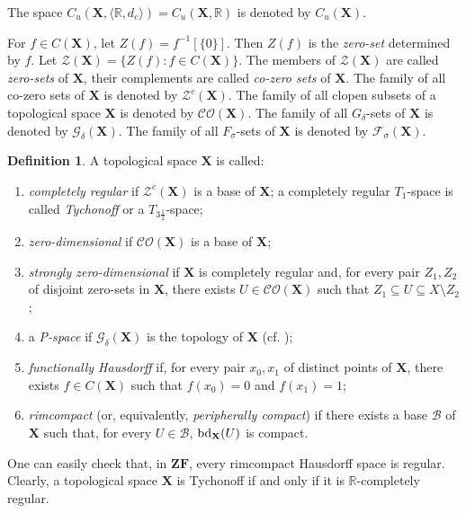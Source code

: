\documentclass[12pt,twoside,leqno]{article}
\theoremstyle{plain}
\theoremstyle{definition}
\newtheorem{definition}[theorem]{Definition}
\theoremstyle{remark}
\DeclareMathOperator{\bd}{{\rm bd}}
\begin{document}
The space $C_{u}(\mathbf{X}, \langle \mathbb{R}, d_e\rangle)=C_{u}(\mathbf{X}, \mathbb{R})$ is denoted by $C_{u}(\mathbf{X})$. 

For $f\in C(\mathbf{X})$, let $Z(f)=f^{-1}[\{0\}]$. Then $Z(f)$ is the \emph{zero-set} determined by $f$. Let $\mathcal{Z}(\mathbf{X})=\{Z(f): f\in C(\mathbf{X})\}$. The members of $\mathcal{Z}(\mathbf{X})$ are called \emph{zero-sets} of $\mathbf{\mathbf{X}}$, their complements are called \emph{co-zero sets} of $\mathbf{\mathbf{X}}$. The family of all co-zero sets of $\mathbf{X}$ is denoted by $\mathcal{Z}^{c}(\mathbf{X})$. The family of all clopen subsets of a topological space $\mathbf{X}$ is denoted by $\mathcal{CO}(\mathbf{X})$. The family of all $G_{\delta}$-sets of $\mathbf{X}$ is denoted by $\mathcal{G}_{\delta}(\mathbf{X})$. The family of all $F_{\sigma}$-sets of $\mathbf{X}$ is denoted by $\mathcal{F}_{\sigma}(\mathbf{X})$.

\begin{definition}
	\label{s1:d15}
	A topological space $\mathbf{X}$ is called:
	\begin{enumerate}
		\item[(i)] \emph{completely regular} if $\mathcal{Z}^c(\mathbf{X})$ is a base of $\mathbf{X}$; a completely regular $T_1$-space is called \emph{Tychonoff} or a $T_{3\frac{1}{2}}$-space;
		\item[(ii)] \emph{zero-dimensional} if $\mathcal{CO}(\mathbf{X})$ is a base of $\mathbf{X}$;
		\item[(iii)] \emph{strongly zero-dimensional} if $\mathbf{X}$ is completely regular and, for every pair $Z_1,Z_2$ of disjoint zero-sets in $\mathbf{X}$, there exists $U\in\mathcal{CO}(\mathbf{X})$ such that $Z_1\subseteq U\subseteq X\setminus Z_2$;
		\item[(iv)] a \emph{P-space} if $\mathcal{G}_{\delta}(\mathbf{X})$ is the topology of $\mathbf{X}$ (cf. \cite{gh});
		\item[(v)] \emph{functionally Hausdorff} if, for every pair $x_0, x_1$ of distinct points of $\mathbf{X}$, there exists $f\in C(\mathbf{X})$ such that $f(x_0)=0$ and $f(x_1)=1$;
		\item[(vi)] \emph{rimcompact} (or, equivalently, \emph{peripherally compact}) if there exists a base $\mathcal{B}$ of $\mathbf{X}$ such that, for every $U\in\mathcal{B}$, $\bd_{\mathbf{X}}(U)$ is compact.
	\end{enumerate}
\end{definition}

One can easily check that, in $\mathbf{ZF}$, every rimcompact Hausdorff space is regular. Clearly, a topological space $\mathbf{X}$ is Tychonoff if and only if it is $\mathbb{R}$-completely regular.
\end{document}
